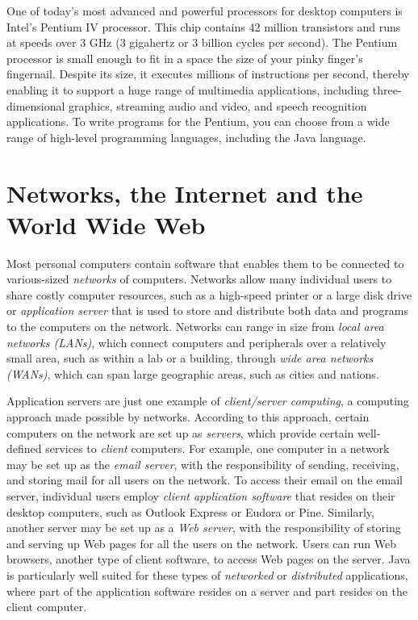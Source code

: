One of today's most advanced and powerful processors for desktop
computers is Intel's Pentium IV processor.  This chip contains 42
million transistors and runs at speeds over 3 GHz (3 gigahertz or 3
billion cycles per second). The Pentium processor is small enough to
fit in a space the size of your pinky finger's fingernail. Despite its
size, it executes millions of instructions per second, thereby
enabling it to support a huge range of multimedia applications,
including three-dimensional graphics, streaming audio and video, and
speech recognition applications.  To write programs for the Pentium,
you can choose from a wide range of high-level programming languages,
including the Java language.

\section{Networks, the Internet and the World Wide Web}
\noindent Most personal computers contain software that enables them to be
connected to various-sized {\it networks} of
computers.  Networks allow many individual users to share costly
computer resources, such as a high-speed printer or a large disk drive
or {\it application server} that is used to store and distribute both
data and programs to the computers on the network. Networks can range
in size from {\it local area networks (LANs)}, which connect computers
and peripherals over a relatively small area, such as within a lab or
a building, through {\it wide area networks (WANs)}, which can span
large geographic areas, such as cities and nations.


Application servers are just one example of {\it client/server
computing}, a computing approach made possible by
networks.  According to this approach, certain computers on the
network are set up as {\it servers}, which provide certain
well-defined services to {\it client} computers.  For example, one
computer in a network may be set up as the {\it email server}, with
the responsibility of sending, receiving, and storing mail for all
users on the network.  To access their email on the email server,
individual users employ {\em client application software} that resides
on their desktop computers, such as Outlook Express or Eudora or Pine.
Similarly, another server may be set up as a {\it Web server}, with
the responsibility of storing and serving up Web pages for all the
users on the network.  Users can run Web browsers, another type of
client software, to access Web pages on the server.  Java is
particularly well suited for these types of {\em networked} or {\em
distributed} applications, where part of the application software
resides on a server and part resides on the client computer.


